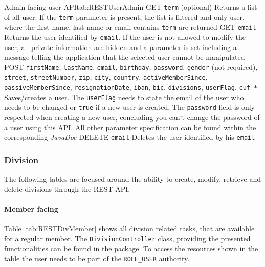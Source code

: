\begin{RESTTable}{Admin facing user API}{tab:RESTUserAdmin}
		{GET}
		{\texttt{term} (optional)} 
		{Returns a list of all user. If the \texttt{term} parameter is present, the list is filtered and only user, where the first name, last name or email contains \texttt{term} are returned}
		{GET}
		{\texttt{email}}
		{Returns the user identified by \texttt{email}. If the user is not allowed to modify the user, all private information are hidden and a parameter is set including a message telling the application that the selected user cannot be manipulated}
		{POST}
		{\texttt{firstName}, \texttt{lastName}, \texttt{email}, \texttt{birthday}, \texttt{password}, \texttt{gender} (not required), \texttt{street}, \texttt{streetNumber}, \texttt{zip}, \texttt{city}, \texttt{country}, \texttt{activeMemberSince}, \texttt{passiveMemberSince}, \texttt{resignationDate}, \texttt{iban}, \texttt{bic}, \texttt{divisions}, \texttt{userFlag}, \texttt{cuf\_*}} 
		{Saves/creates a user. The \texttt{userFlag} needs to state the email of the user who needs to be changed or \texttt{true} if a new user is created. The \texttt{password} field is only respected when creating a new user, concluding you can`t change the password of a user using this API. All other parameter specification can be found within the corresponding \emph{JavaDoc}}
		{DELETE}
		{\texttt{email}}
		{Deletes the user identified by his \texttt{email}}
\end{RESTTable}

\subsubsection{Division}
The following tables are focused around the ability to create, modify, retrieve and delete divisions through the \gls{REST} {API}.

\paragraph{Member facing}
Table \vref{tab:RESTDivMember} shows all division related tasks, that are available for a regular member. The \texttt{DivisionController} class, providing the presented functionalities can be found in the  package. To access the resources shown in the table the user needs to be part of the \texttt{ROLE\_USER} authority.

